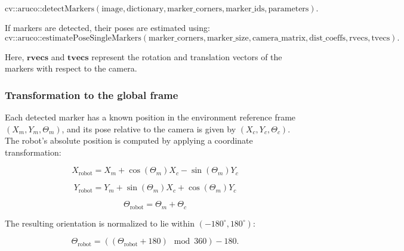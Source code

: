 \documentclass{CSSRforAfrica}
\begin{document}
\begin{equation}
\text{cv::aruco::detectMarkers}(\text{image}, \text{dictionary}, \text{marker\_corners}, \text{marker\_ids}, \text{parameters}).
\end{equation}

If markers are detected, their poses are estimated using:
\begin{equation}
\text{cv::aruco::estimatePoseSingleMarkers}(\text{marker\_corners}, \text{marker\_size}, \text{camera\_matrix}, \text{dist\_coeffs}, \text{rvecs}, \text{tvecs}).
\end{equation}

Here, \( \textbf{rvecs} \) and \( \textbf{tvecs} \) represent the rotation and translation vectors of the markers with respect to the camera.

\subsubsection*{Transformation to the global frame}

Each detected marker has a known position in the environment reference frame \((X_m, Y_m, \Theta_m)\), and its pose relative to the camera is given by \((X_c, Y_c, \Theta_c)\). The robot’s absolute position is computed by applying a coordinate transformation:

\begin{equation}
X_{\text{robot}} = X_m + \cos(\Theta_m) X_c - \sin(\Theta_m) Y_c
\end{equation}

\begin{equation}
Y_{\text{robot}} = Y_m + \sin(\Theta_m) X_c + \cos(\Theta_m) Y_c
\end{equation}

\begin{equation}
\Theta_{\text{robot}} = \Theta_m + \Theta_c
\end{equation}

The resulting orientation is normalized to lie within \( (-180^\circ, 180^\circ) \):

\begin{equation}
\Theta_{\text{robot}} = \left( (\Theta_{\text{robot}} + 180) \mod 360 \right) - 180.
\end{equation}

\end{document}
